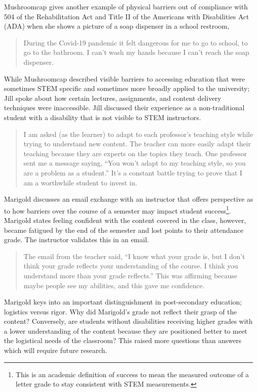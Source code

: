 \documentclass{sig-alternate} %
\begin{document}
\begin{large}
Mushroomcap gives another example of physical barriers out of compliance with 504 of the Rehabilitation Act and Title II of the Americans with Disabilities Act (ADA) when she shows a picture of a soap dispenser in a school restroom,

\begin{quote}
During the Covid-19 pandemic it felt dangerous for me to go to school, to go to the bathroom. I can’t wash my hands because I can’t reach the soap dispenser.
\end{quote}

While Mushroomcap described visible barriers to accessing education that were sometimes STEM specific and sometimes more broadly applied to the university; Jill spoke about how certain lectures, assignments, and content delivery techniques were inaccessible. Jill discussed their experience as a non-traditional student with a disability that is not visible to STEM instructors.

\begin{quote}
I am asked (as the learner) to adapt to each professor’s teaching style while trying to understand new content. The teacher can more easily adapt their teaching because they are experts on the topics they teach. One professor sent me a message saying, “You won’t adapt to my teaching style, so you are a problem as a student.” It’s a constant battle trying to prove that I am a worthwhile student to invest in.
\end{quote}

Marigold discusses an email exchange with an instructor that offers perspective as to how barriers over the course of a semester may impact student success\footnote{This is an academic definition of success to mean the measured outcome of a letter grade to stay consistent with STEM measurements.}. Marigold states feeling confident with the content covered in the class, however, became fatigued by the end of the semester and lost points to their attendance grade. The instructor validates this in an email.

\begin{quote}
The email from the teacher said, “I know what your grade is, but I don’t think your grade reflects your understanding of the course. I think you understand more than your grade reflects.” This was affirming because maybe people see my abilities, and this gave me confidence. 
\end{quote}

Marigold keys into an important distinguishment in post-secondary education; logistics versus rigor. Why did Marigold’s grade not reflect their grasp of the content? Conversely, are students without disabilities receiving higher grades with a lower understanding of the content because they are positioned better to meet the logistical needs of the classroom? This raised more questions than answers which will require future research.


\end{large}
\end{document}
